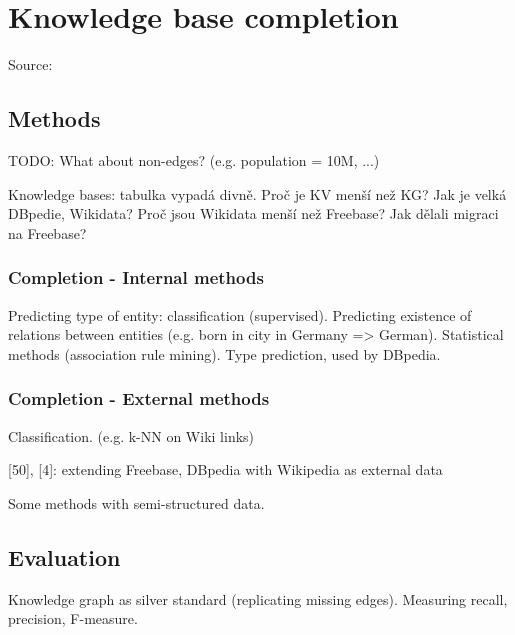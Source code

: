 \chapter{Knowledge base completion}

Source: \cite{kg-refinement-survey}

\section{Methods}

TODO: What about non-edges? (e.g. population = 10M, ...)

Knowledge bases: tabulka vypadá divně. Proč je KV menší než KG?
Jak je velká DBpedie, Wikidata? Proč jsou Wikidata menší než Freebase?
Jak dělali migraci na Freebase?

\subsection{Completion - Internal methods}

Predicting type of entity: classification (supervised).
Predicting existence of relations between entities (e.g. born in city in Germany
=> German).
Statistical methods (association rule mining). Type prediction, used by DBpedia.

\subsection{Completion - External methods}

Classification. (e.g. k-NN on Wiki links)

[50], [4]: extending Freebase, DBpedia with Wikipedia as external data

Some methods with semi-structured data.

\section{Evaluation}

Knowledge graph as silver standard (replicating missing edges).
Measuring recall, precision, F-measure.
